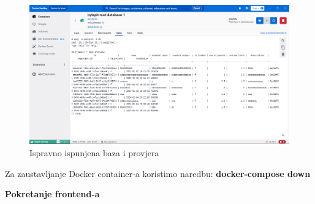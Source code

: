 				\begin{figure}[H]
					\includegraphics[scale=0.4]{slike/postgres.PNG} 
					\centering
					\caption{Ispravno ispunjena baza i provjera}
					\label{fig:docker_desktop_postgres}
				\end{figure}
				\noindent Za zaustavljanje Docker container-a koristimo naredbu: \textbf{docker-compose down}\\
				
			\eject
			
			\noindent\textbf{Pokretanje frontend-a}\\
			
